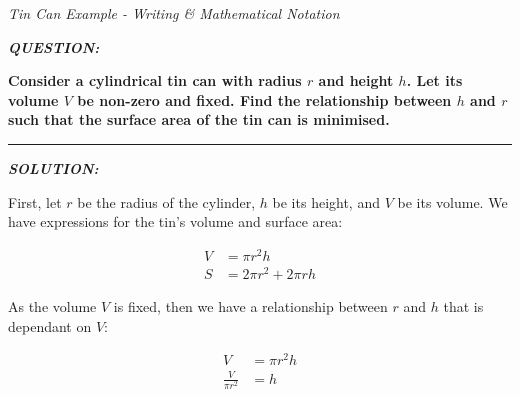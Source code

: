 \documentclass[12pt]{article}
\begin{document}
\begin{center}
\LARGE{\textit{Tin Can Example - Writing \& Mathematical Notation}}
\end{center}

\vspace{15mm}

\textbf{\textit{QUESTION:}}

\textbf{Consider a cylindrical tin can with radius $r$ and height $h$. Let its volume $V$ be non-zero and fixed. Find the relationship between $h$ and $r$ such that the surface area of the tin can is minimised.}

\vspace{5mm}
\hrule
\vspace{5mm}

\textbf{\textit{SOLUTION:}}

\vspace{5mm}

\begin{mdframed}[linewidth=0.5mm, backgroundcolor=orange!10]
First, let $r$ be the radius of the cylinder, $h$ be its height, and $V$ be its volume. We have expressions for the tin's volume and surface area:
\end{mdframed}


\begin{minipage}[t]{\textwidth}
\begin{mdframed}[linewidth=0.5mm, backgroundcolor=cyan!10]
\begin{align*}
V &= \pi r^2 h \\
S &= 2\pi r^2 + 2 \pi rh
\end{align*}
\end{mdframed}
\end{minipage}

\vspace{5mm}

\begin{mdframed}[linewidth=0.5mm, backgroundcolor=orange!10]
As the volume $V$ is fixed, then we have a relationship between $r$ and $h$ that is dependant on $V$:
\end{mdframed}


\begin{minipage}[t]{\textwidth}
\begin{mdframed}[linewidth=0.5mm, backgroundcolor=cyan!10]
\begin{align*}
V &= \pi r^2 h \\
\frac{V}{\pi r^2} &= h \\
\end{align*}
\end{mdframed}
\end{minipage}
\end{document}
